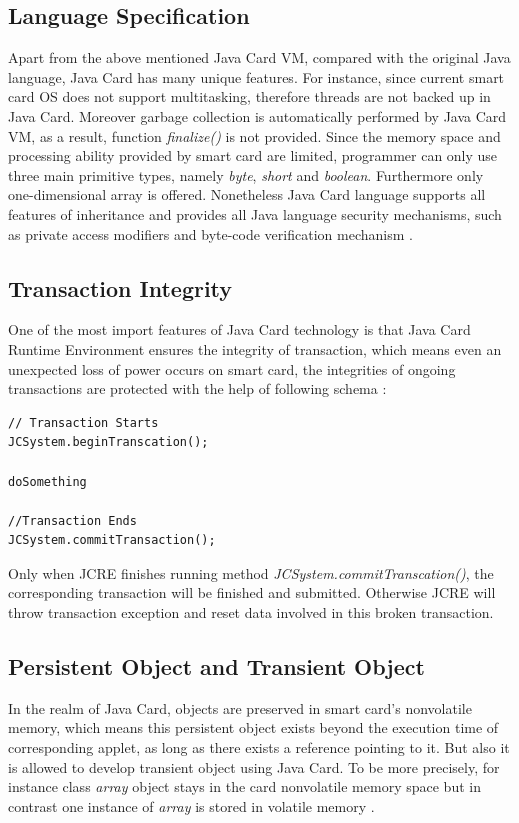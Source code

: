 \subsection{Language Specification}
Apart from the above mentioned Java Card VM, compared with the original Java language, Java Card has many unique features. For instance,
since current smart card OS does not support multitasking, therefore threads are not backed up in Java Card. Moreover garbage collection is automatically performed by Java Card VM, as a result, function \emph{finalize()} is not provided. Since the memory space and processing ability provided by smart card are limited, programmer can only use three main primitive types, namely \emph{byte}, \emph{short} and \emph{boolean}. Furthermore only one-dimensional array is offered. Nonetheless Java Card language supports all features of inheritance and provides all Java language security mechanisms, such as private access modifiers and byte-code verification mechanism \cite{jcadg}.

\subsection{Transaction Integrity}
One of the most import features of Java Card technology is that Java Card Runtime Environment ensures the integrity of transaction, which means even an unexpected loss of power occurs on smart card, the integrities of ongoing transactions are protected with the help of following schema \cite{handbuch}:
\begin{verbatim}
// Transaction Starts
JCSystem.beginTranscation();

doSomething

//Transaction Ends
JCSystem.commitTransaction();
\end{verbatim}
Only when JCRE finishes running method \emph{JCSystem.commitTranscation()}, the corresponding transaction will be finished and submitted. Otherwise JCRE will throw transaction exception and reset data involved in this broken transaction.

\subsection{Persistent Object and Transient Object}
In the realm of Java Card, objects are preserved in smart card's nonvolatile memory, which means this persistent object exists beyond the execution time of corresponding applet, as long as there exists a reference pointing to it. But also it is allowed to develop transient object using Java Card. To be more precisely, for instance class \emph{array} object stays in the card nonvolatile memory space but in contrast one instance of \emph{array} is stored in volatile memory \cite{handbuch}.

